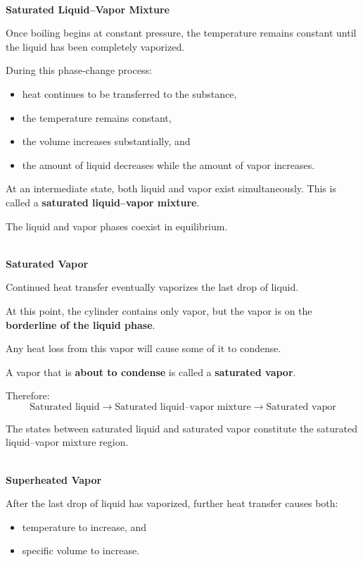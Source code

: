 \documentclass[12pt]{article}
\begin{document}
\textbf{\\ Saturated Liquid--Vapor Mixture}

Once boiling begins at constant pressure, the temperature remains constant until the liquid has been completely vaporized.

During this phase-change process:
\begin{itemize}
    \item heat continues to be transferred to the substance,
    \item the temperature remains constant,
    \item the volume increases substantially, and
    \item the amount of liquid decreases while the amount of vapor increases.
\end{itemize}

At an intermediate state, both liquid and vapor exist simultaneously. This is called a \textbf{saturated liquid--vapor mixture}.

The liquid and vapor phases coexist in equilibrium.


\textbf{\\ Saturated Vapor}

Continued heat transfer eventually vaporizes the last drop of liquid.

At this point, the cylinder contains only vapor, but the vapor is on the \textbf{borderline of the liquid phase}.

Any heat loss from this vapor will cause some of it to condense.

A vapor that is \textbf{about to condense} is called a \textbf{saturated vapor}.

Therefore:
\begin{equation*}
\boxed{\text{Saturated liquid} \rightarrow
\text{Saturated liquid--vapor mixture} \rightarrow
\text{Saturated vapor}}
\end{equation*}

The states between saturated liquid and saturated vapor constitute the saturated liquid--vapor mixture region.

\textbf{\\ Superheated Vapor}

After the last drop of liquid has vaporized, further heat transfer causes both:
\begin{itemize}
    \item temperature to increase, and
    \item specific volume to increase.
\end{itemize}
\end{document}
